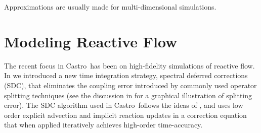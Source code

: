 \documentclass[a4paper]{jpconf}
\newcommand{\castro}{{\sffamily Castro}}
\begin{document}
Approximations are usually made for multi-dimensional simulations.

\section{Modeling Reactive Flow}

The recent focus in \castro\ has been on high-fidelity simulations of
reactive flow.  In \cite{castro:sdc} we introduced a new time
integration strategy, spectral deferred corrections (SDC), that
eliminates the coupling error introduced by commonly used operator
splitting techniques (see the discussion in \cite{astronum:2018} for a
graphical illustration of splitting error).  The SDC algorithm used in
\castro\ follows the ideas of \cite{dutt:2000,minion:2003}, and uses
low order explicit advection and implicit reaction updates in a
correction equation that when applied iteratively achieves high-order
time-accuracy.
\end{document}
